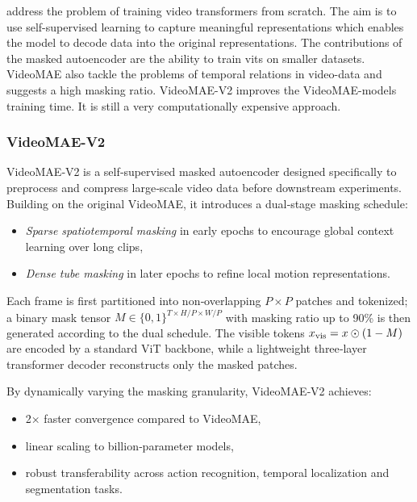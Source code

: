 \textcite{tong_videomae_2022} address the problem of training video transformers from scratch. The aim is to use self-supervised learning to capture meaningful representations which enables the model to decode data into the original representations. The contributions of the masked autoencoder \cite{tong_videomae_2022} are the ability to train \acrshort{vit}s on smaller datasets. VideoMAE \cite{tong_videomae_2022} also tackle the problems of temporal relations in video-data and suggests a high masking ratio. VideoMAE-V2 \cite{wang_videomae_2023} improves the VideoMAE-models training time. It is still a very computationally expensive approach. 

\subsubsection{VideoMAE-V2}
\label{sssec:videomae_v2}

VideoMAE‑V2 \cite{wang_videomae_2023} is a self‑supervised masked autoencoder designed specifically to preprocess and compress large‑scale video data before downstream experiments. Building on the original VideoMAE, it introduces a dual‑stage masking schedule: 
\begin{itemize}
    \item \emph{Sparse spatiotemporal masking} in early epochs to encourage global context learning over long clips,
    \item \emph{Dense tube masking} in later epochs to refine local motion representations.
\end{itemize}
Each frame is first partitioned into non‑overlapping $P\times P$ patches and tokenized; a binary mask tensor $M\in\{0,1\}^{T\times H/P\times W/P}$ with masking ratio up to 90\% is then generated according to the dual schedule. The visible tokens $x_{\rm vis}=x\odot(1-M)$ are encoded by a standard ViT backbone, while a lightweight three‑layer transformer decoder reconstructs only the masked patches. 

By dynamically varying the masking granularity, VideoMAE‑V2 achieves:
\begin{itemize}
    \item 2× faster convergence compared to VideoMAE,
    \item linear scaling to billion‑parameter models,
    \item robust transferability across action recognition, temporal localization and segmentation tasks.
\end{itemize}

